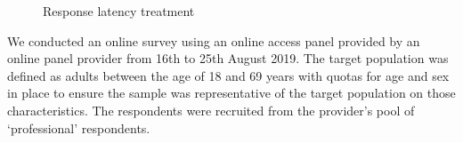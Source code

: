 \documentclass[Royal,times,sageh]{sagej}
\begin{document}
\begin{figure}

{\centering {}\newline{}

}

\caption{\label{fig:rls}Response latency treatment}\label{fig:response-latency-plots}
\end{figure}

We conducted an online survey using an online access panel provided by
an online panel provider from 16th to 25th August 2019. The target
population was defined as adults between the age of 18 and 69 years with
quotas for age and sex in place to ensure the sample was representative
of the target population on those characteristics. The respondents were
recruited from the provider's pool of `professional' respondents.
\end{document}
